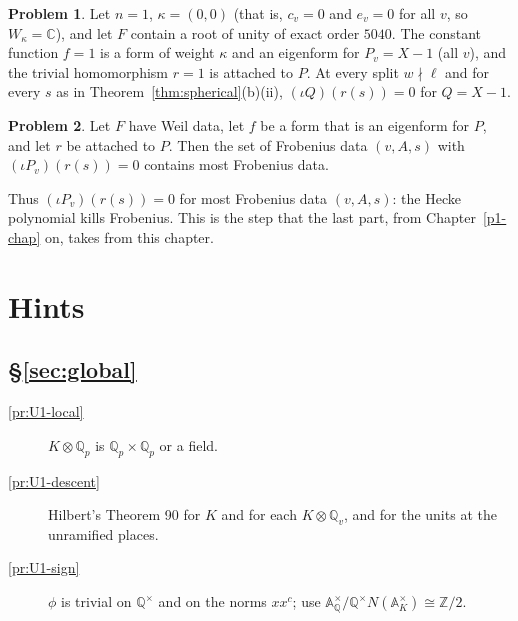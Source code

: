 \documentclass[reqno]{amsart}
\newcounter{chap}
\theoremstyle{definition}
\newtheorem{problem}{Problem}[section]
\theoremstyle{plain}
\newcommand{\Z}{\mathbb{Z}}
\newcommand{\Q}{\mathbb{Q}}
\newcommand{\C}{\mathbb{C}}
\newcommand{\A}{\mathbb{A}}
\begin{document}
\begin{problem}\label{pr:trivial-instance}
Let \(n = 1\), \(\kappa = (0, 0)\) (that is, \(c_v = 0\) and \(e_v = 0\) for all \(v\), so \(W_\kappa = \C\)), and let \(F\) contain a root of unity of exact order \(5040\).  The constant function \(f = 1\) is a form of weight \(\kappa\) and an eigenform for \(P_v = X - 1\) (all \(v\)), and the trivial homomorphism \(r = 1\) is attached to \(P\).  At every split \(w \nmid \ell\) and for every \(s\) as in Theorem~\ref{thm:spherical}(b)(ii), \((\iota Q)(r(s)) = 0\) for \(Q = X - 1\).
\end{problem}

\begin{problem}\label{pr:most-frobenii}
Let \(F\) have Weil data, let \(f\) be a form that is an eigenform for \(P\), and let \(r\) be attached to \(P\).  Then the set of Frobenius data \((v, A, s)\) with \((\iota P_v)(r(s)) = 0\) contains most Frobenius data.
\end{problem}

Thus \((\iota P_v)(r(s)) = 0\) for most Frobenius data \((v, A, s)\): the Hecke polynomial kills Frobenius.  This is the step that the last part, from Chapter~\ref{p1-chap} on, takes from this chapter.

\section*{Hints}

\subsection*{\S\ref{sec:global}}
\begin{description}
\item[\ref{pr:U1-local}] \(K \otimes \Q_p\) is \(\Q_p \times \Q_p\) or a field.
\item[\ref{pr:U1-descent}] Hilbert's Theorem 90 for \(K\) and for each \(K \otimes \Q_v\), and for the units at the unramified places. %
\item[\ref{pr:U1-sign}] \(\phi\) is trivial on \(\Q^\times\) and on the norms \(x x^c\); use \(\A_\Q^\times/\Q^\times N(\A_K^\times) \cong \Z/2\).
\end{description}
\end{document}
